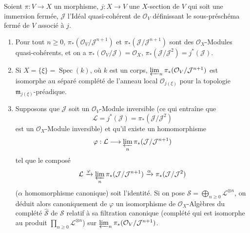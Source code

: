 \begin{lemma}[8.10.1]
\label{II.8.10.1-fr}
Soient $\pi:V\to X$ un morphisme, $j:X\to V$ une $X$-section de $V$ qui soit
une immersion fermée, $\mathcal{J}$ l'Idéal quasi-cohérent de
$\mathcal{O}_V$ définissant le sous-préschéma fermé de $V$ associé à $j$.
\begin{enumerate}
  \item[\rm{(i)}] Pour tout $n\geqslant 0$,
  $\pi_*(\mathcal{O}_V/\mathcal{J}^{n+1})$ et
  $\pi_*(\mathcal{J}/\mathcal{J}^{n+1})$ sont des
  $\mathcal{O}_X$-Modules quasi-cohérents, et on a
  $\pi_*(\mathcal{O}_V/\mathcal{J})=\mathcal{O}_X$,
  $\pi_*(\mathcal{J}/\mathcal{J}^2)=j^*(\mathcal{J})$.
  \item[\rm{(ii)}] Si $X=\{\xi\}=\operatorname{Spec}(k)$, où $k$ est un
  corps, $\varprojlim_n\pi_*(\mathcal{O}_V/\mathcal{J}^{n+1})$ est isomorphe
  au séparé complété de l'anneau local $\mathcal{O}_{j(\xi)}$ pour la
  topologie $\mathfrak{m}_{j(\xi)}$-préadique.
  \item[\rm{(iii)}] Supposons que $\mathcal{J}$ soit un
  $\mathcal{O}_V$-Module inversible (ce qui entraîne que
  \[
    \mathcal{L}=j^*(\mathcal{J})=
    \pi_*(\mathcal{J}/\mathcal{J}^2)
  \]
  est un $\mathcal{O}_X$-Module inversible) et qu'il existe un homomorphisme
  \[
    \varphi:\mathcal{L}\longrightarrow
    \varprojlim_n\pi_*(\mathcal{J}/\mathcal{J}^{n+1})
  \]
  tel que le composé
  \[
    \mathcal{L}\xrightarrow{\varphi}
    \varprojlim_n\pi_*(\mathcal{J}/\mathcal{J}^{n+1})
    \xrightarrow{\alpha}\pi_*(\mathcal{J}/\mathcal{J}^2)
  \]
  ($\alpha$ homomorphisme canonique) soit l'identité. Si on pose
  $\mathcal{S}=\bigoplus_{n\geqslant0}\mathcal{L}^{\otimes n}$, on déduit
  alors canoniquement de $\varphi$ un isomorphisme de
  $\mathcal{O}_X$-Algèbres du complété $\widehat{\mathcal{S}}$ de
  $\mathcal{S}$ relatif à sa filtration canonique (complété qui est isomorphe
  au produit $\prod_{n\geqslant0}\mathcal{L}^{\otimes n}$) sur
  $\varprojlim_n\pi_*(\mathcal{O}_V/\mathcal{J}^{n+1})$.
\end{enumerate}
\end{lemma}

